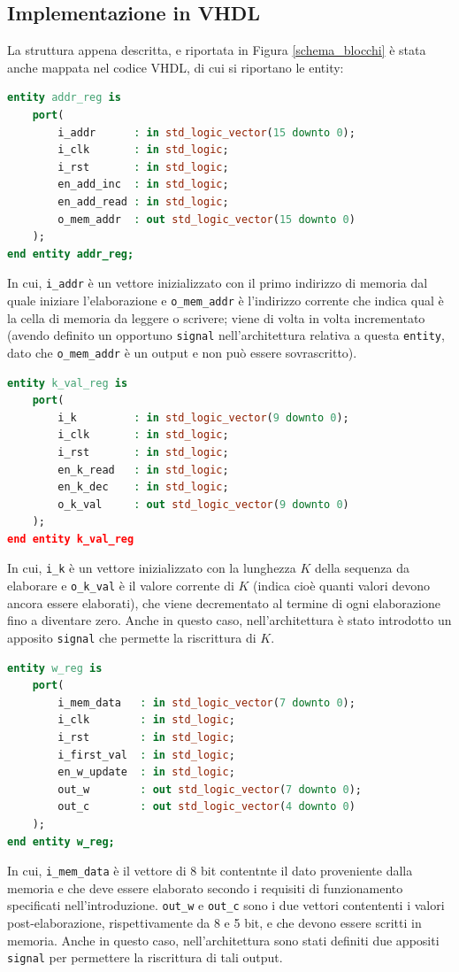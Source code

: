\documentclass[10pt]{article}
\begin{document}
	\subsection{Implementazione in VHDL}
	La struttura appena descritta, e riportata in Figura \ref{schema_blocchi} è stata anche mappata nel codice VHDL, di cui si riportano le entity:
	\begin{lstlisting}[language=vhdl]
entity addr_reg is
	port(
		i_addr      : in std_logic_vector(15 downto 0);
		i_clk       : in std_logic;
		i_rst       : in std_logic;
		en_add_inc  : in std_logic;
		en_add_read : in std_logic;
		o_mem_addr  : out std_logic_vector(15 downto 0)
	);
end entity addr_reg;
\end{lstlisting}
	In cui, \lstinline[style=vhdl]|i_addr| è un vettore inizializzato con il primo indirizzo di memoria dal quale iniziare l'elaborazione e \lstinline[style=vhdl]|o_mem_addr| è l'indirizzo corrente che indica qual è la cella di memoria da leggere o scrivere; viene di volta in volta incrementato (avendo definito un opportuno \lstinline[style=vhdl]|signal| nell'architettura relativa a questa \lstinline[style=vhdl]|entity|, dato che \lstinline[style=vhdl]|o_mem_addr| è un output e non può essere sovrascritto).
	\begin{lstlisting}[language=vhdl]
entity k_val_reg is
	port(
		i_k         : in std_logic_vector(9 downto 0);
		i_clk       : in std_logic;
		i_rst       : in std_logic;
		en_k_read   : in std_logic;
		en_k_dec    : in std_logic;
		o_k_val     : out std_logic_vector(9 downto 0)
	);
end entity k_val_reg
\end{lstlisting}
	In cui,  \lstinline[style=vhdl]|i_k| è un vettore inizializzato con la lunghezza $K$ della sequenza da elaborare e \lstinline[style=vhdl]|o_k_val| è il valore corrente di $K$ (indica cioè quanti valori devono ancora essere elaborati), che viene decrementato al termine di ogni elaborazione fino a diventare zero. Anche in questo caso, nell'architettura è stato introdotto un apposito \lstinline[style=vhdl]|signal| che permette la riscrittura di $K$.
	\begin{lstlisting}[language=vhdl]
entity w_reg is
	port(
		i_mem_data   : in std_logic_vector(7 downto 0);
		i_clk        : in std_logic;
		i_rst        : in std_logic;
		i_first_val  : in std_logic;
		en_w_update  : in std_logic;
		out_w        : out std_logic_vector(7 downto 0);
		out_c        : out std_logic_vector(4 downto 0)
	);
end entity w_reg;
\end{lstlisting}
	In cui, \lstinline[style=vhdl]|i_mem_data| è il vettore di 8 bit contentnte il dato proveniente dalla memoria e che deve essere elaborato secondo i requisiti di funzionamento specificati nell'introduzione. \lstinline[style=vhdl]|out_w| e  \lstinline[style=vhdl]|out_c| sono i due vettori contententi i valori post-elaborazione, rispettivamente da 8 e 5 bit, e che devono essere scritti in memoria. Anche in questo caso, nell'architettura sono stati definiti due appositi \lstinline[style=vhdl]|signal| per permettere la riscrittura di tali output.
\end{document}
